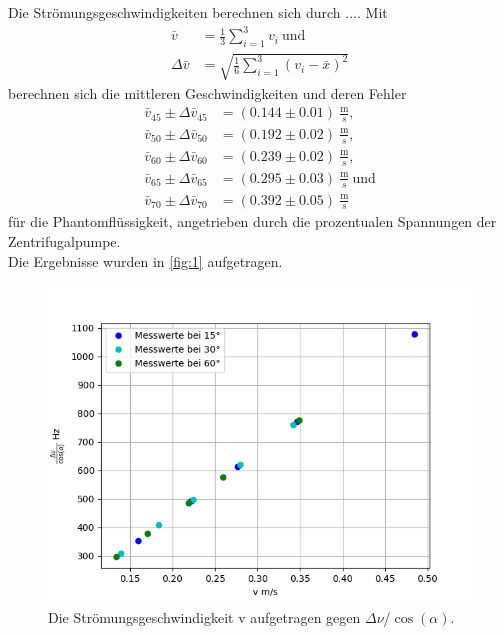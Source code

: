 Die Strömungsgeschwindigkeiten berechnen sich durch ....
Mit 
\begin{align*}
  \bar v&=\frac{1}{3}\sum\limits_{i=1}^{3} v_i\ \textrm{und}\\
  \Delta\bar v&=\sqrt{\frac{1}{6}\sum\limits_{i=1}^{3} (v_i - \bar x)^2}
\end{align*}
berechnen sich die mittleren Geschwindigkeiten und deren Fehler 
\begin{align*}
  \bar v_{45} \pm \Delta \bar v_{45}&=(0.144 \pm 0.01)\ \frac{\textrm{m}}{s},\\
  \bar v_{50} \pm \Delta \bar v_{50}&=(0.192 \pm 0.02)\ \frac{\textrm{m}}{s},\\
  \bar v_{60} \pm \Delta \bar v_{60}&=(0.239 \pm 0.02)\ \frac{\textrm{m}}{s},\\
  \bar v_{65} \pm \Delta \bar v_{65}&=(0.295 \pm 0.03)\ \frac{\textrm{m}}{s}\ \textrm{und}\\
  \bar v_{70} \pm \Delta \bar v_{70}&=(0.392 \pm 0.05)\ \frac{\textrm{m}}{s}
\end{align*}
für die Phantomflüssigkeit, angetrieben durch die prozentualen Spannungen der Zentrifugalpumpe.\\
Die Ergebnisse wurden in \autoref{fig:1} aufgetragen.
\begin{figure}[H]
  \centering
  \includegraphics[width=12cm]{content/1}
  \caption{Die Strömungsgeschwindigkeit v aufgetragen gegen $\Delta\nu$/$\cos(\alpha)$.}
  \label{fig:1}
\end{figure}


